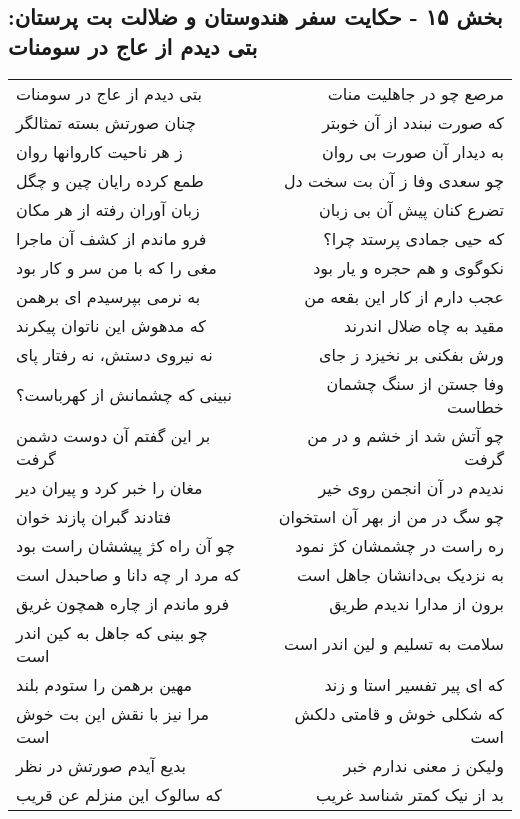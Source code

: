\begin{center}
\section*{بخش ۱۵ - حکایت سفر هندوستان و ضلالت بت پرستان: بتی دیدم از عاج در سومنات}
\label{sec:015}
\begin{longtable}{l p{0.5cm} r}
بتی دیدم از عاج در سومنات
&&
مرصع چو در جاهلیت منات
\\
چنان صورتش بسته تمثالگر
&&
که صورت نبندد از آن خوبتر
\\
ز هر ناحیت کاروانها روان
&&
به دیدار آن صورت بی روان
\\
طمع کرده رایان چین و چگل
&&
چو سعدی وفا ز آن بت سخت دل
\\
زبان آوران رفته از هر مکان
&&
تضرع کنان پیش آن بی زبان
\\
فرو ماندم از کشف آن ماجرا
&&
که حیی جمادی پرستد چرا؟
\\
مغی را که با من سر و کار بود
&&
نکوگوی و هم حجره و یار بود
\\
به نرمی بپرسیدم ای برهمن
&&
عجب دارم از کار این بقعه من
\\
که مدهوش این ناتوان پیکرند
&&
مقید به چاه ضلال اندرند
\\
نه نیروی دستش، نه رفتار پای
&&
ورش بفکنی بر نخیزد ز جای
\\
نبینی که چشمانش از کهرباست؟
&&
وفا جستن از سنگ چشمان خطاست
\\
بر این گفتم آن دوست دشمن گرفت
&&
چو آتش شد از خشم و در من گرفت
\\
مغان را خبر کرد و پیران دیر
&&
ندیدم در آن انجمن روی خیر
\\
فتادند گبران پازند خوان
&&
چو سگ در من از بهر آن استخوان
\\
چو آن راه کژ پیششان راست بود
&&
ره راست در چشمشان کژ نمود
\\
که مرد ار چه دانا و صاحبدل است
&&
به نزدیک بی‌دانشان جاهل است
\\
فرو ماندم از چاره همچون غریق
&&
برون از مدارا ندیدم طریق
\\
چو بینی که جاهل به کین اندر است
&&
سلامت به تسلیم و لین اندر است
\\
مهین برهمن را ستودم بلند
&&
که ای پیر تفسیر استا و زند
\\
مرا نیز با نقش این بت خوش است
&&
که شکلی خوش و قامتی دلکش است
\\
بدیع آیدم صورتش در نظر
&&
ولیکن ز معنی ندارم خبر
\\
که سالوک این منزلم عن قریب
&&
بد از نیک کمتر شناسد غریب
\\

\end{longtable}
\end{center}
